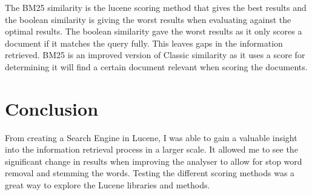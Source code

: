 \newpage	
The BM25 similarity is the lucene scoring method that gives the best results and the boolean similarity is giving the worst results when evaluating against the optimal results. The boolean similarity gave the worst results as it only scores a document if it matches the query fully. This leaves gaps in the information retrieved. BM25 is an improved version of Classic similarity as it uses a score for determining it will find a certain document relevant when scoring the documents. \par 

\section{Conclusion}
From creating a Search Engine in Lucene, I was able to gain a valuable insight into the information retrieval process in a larger scale. It allowed me to see the significant change in results when improving the analyser to allow for stop word removal and stemming  the words. Testing the different scoring methods was a great way to explore the Lucene libraries and methods.\par 
